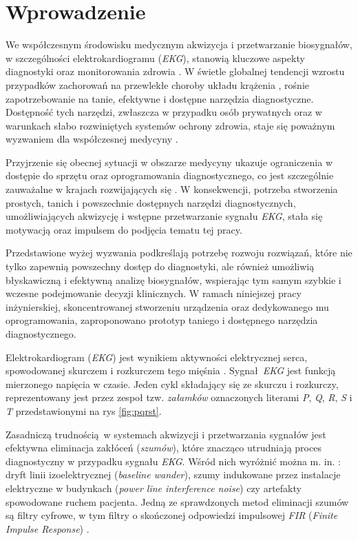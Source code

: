
\chapter*{Wprowadzenie}

We współczesnym środowisku medycznym akwizycja i przetwarzanie biosygnałów,
w szczególności elektrokardiogramu (\textit{EKG}), stanowią kluczowe aspekty diagnostyki oraz
monitorowania zdrowia \cite{Serhani2020}. W świetle globalnej tendencji wzrostu 
przypadków zachorowań na przewlekłe choroby układu krążenia \cite{Gaidai2023}, 
rośnie zapotrzebowanie na tanie, efektywne i dostępne narzędzia diagnostyczne. 
Dostępność tych narzędzi, zwłaszcza w przypadku osób prywatnych oraz w warunkach słabo rozwiniętych 
systemów ochrony zdrowia, staje się poważnym wyzwaniem dla współczesnej medycyny \cite{Faruk2021}.

Przyjrzenie się obecnej sytuacji w obszarze medycyny ukazuje ograniczenia w dostępie do 
sprzętu oraz oprogramowania diagnostycznego, co jest szczególnie zauważalne w krajach rozwijających się \cite{Faruk2021}. 
W konsekwencji, potrzeba stworzenia prostych, tanich i powszechnie dostępnych narzędzi diagnostycznych, umożliwiających 
akwizycję i wstępne przetwarzanie sygnału \textit{EKG}, stała się motywacją oraz impulsem do podjęcia tematu tej pracy.

Przedstawione wyżej wyzwania podkreślają potrzebę rozwoju rozwiązań, które nie tylko zapewnią powszechny dostęp
do diagnostyki, ale również umożliwią błyskawiczną i efektywną analizę biosygnałów, wspierając tym samym szybkie 
i wczesne podejmowanie decyzji klinicznych. W ramach niniejszej pracy inżynierskiej, skoncentrowanej stworzeniu urządzenia 
oraz dedykowanego mu oprogramowania, zaproponowano prototyp taniego i dostępnego narzędzia diagnostycznego. 

Elektrokardiogram (\textit{EKG}) jest wynikiem aktywności elektrycznej serca, spowodowanej skurczem i rozkurczem tego mięśnia 
\cite{Limaye2016}. Sygnał \textit{EKG} jest funkcją mierzonego napięcia w czasie. 
Jeden cykl składający się ze skurczu i rozkurczy, reprezentowany jest przez zespoł tzw. \textit{załamków} 
oznaczonych literami \textit{P}, \textit{Q}, \textit{R}, \textit{S} i \textit{T} przedstawionymi na rys \ref{fig:pqrst}.

Zasadniczą trudnością w systemach akwizycji i przetwarzania sygnałów jest efektywna eliminacja zakłóceń (\textit{szumów}), które
znacząco utrudniają proces diagnostyczny w przypadku sygnału \textit{EKG}. Wśród nich wyróżnić można m. in. \cite{Limaye2016}: 
dryft linii izoelektrycznej (\textit{baseline wander}), 
szumy indukowane przez instalacje elektryczne w budynkach (\textit{power line interference noise}) 
czy artefakty spowodowane ruchem pacjenta. Jedną ze sprawdzonych metod eliminacji szumów są filtry cyfrowe, w tym filtry 
o skończonej odpowiedzi impulsowej \textit{FIR} (\textit{Finite Impulse Response}) \cite{Tompkins1993}.

